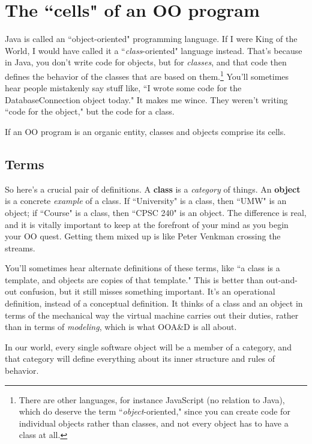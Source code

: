 
\chapter{The ``cells" of an OO program}
\label{ch:cells}

Java is called an ``object-oriented" programming language. If I were King of
the World, I would have called it a ``\textit{class}-oriented" language
instead. That's because in Java, you don't write code for objects, but for
\textit{classes}, and that code then defines the behavior of the classes that
are based on them.\footnote{There are other languages, for instance JavaScript
(no relation to Java), which do deserve the term ``\textit{object}-oriented,"
since you can create code for individual objects rather than classes, and not
every object has to have a class at all.} You'll sometimes hear people
mistakenly say stuff like, ``I wrote some code for the DatabaseConnection
object today." It makes me wince. They weren't writing ``code for the
object," but the code for a class.

If an OO program is an organic entity, classes and objects comprise its cells.

\section{Terms}

So here's a crucial pair of definitions. A \textbf{class} is a
\textit{category} of things. An \textbf{object} is a concrete \textit{example}
of a class. If ``University" is a class, then ``UMW" is an object; if
``Course" is a class, then ``CPSC 240" is an object. The difference is real,
and it is vitally important to keep at the forefront of your mind as you begin
your OO quest. Getting them mixed up is like Peter Venkman crossing the
streams.

You'll sometimes hear alternate definitions of these terms, like ``a class is
a template, and objects are copies of that template." This is better than
out-and-out confusion, but it still misses something important. It's an
operational definition, instead of a conceptual definition. It thinks of a
class and an object in terms of the mechanical way the virtual machine carries
out their duties, rather than in terms of \textit{modeling}, which is what
OOA\&D is all about.

In our world, every single software object will be a member of a category,
and that category will define everything about its inner structure and rules
of behavior.

